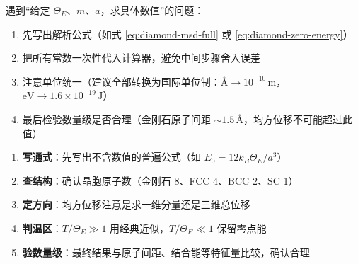 \begin{insightbox}[物理图像与概念深化]
遇到``给定 $\Theta_E$、$m$、$a$，求具体数值''的问题：
\begin{enumerate}
    \item 先写出解析公式（如式 \eqref{eq:diamond-msd-full} 或 \eqref{eq:diamond-zero-energy}）
    \item 把所有常数一次性代入计算器，避免中间步骤舍入误差
    \item 注意单位统一（建议全部转换为国际单位制：$\text{\AA}\to10^{-10}\,\mathrm{m}$，$\mathrm{eV}\to1.6\times10^{-19}\,\mathrm{J}$）
    \item 最后检验数量级是否合理（金刚石原子间距 $\sim1.5\,\text{\AA}$，均方位移不可能超过此值）
\end{enumerate}
\end{insightbox}

\begin{thinkbox}
\begin{enumerate}
    \item \textbf{写通式}：先写出不含数值的普遍公式（如 $E_0=12k_B\Theta_E/a^3$）
    \item \textbf{查结构}：确认晶胞原子数（金刚石 8、FCC 4、BCC 2、SC 1）
    \item \textbf{定方向}：均方位移注意是求一维分量还是三维总位移
    \item \textbf{判温区}：$T/\Theta_E\gg1$ 用经典近似，$T/\Theta_E\ll1$ 保留零点能
    \item \textbf{验数量级}：最终结果与原子间距、结合能等特征量比较，确认合理
\end{enumerate}
\end{thinkbox}
